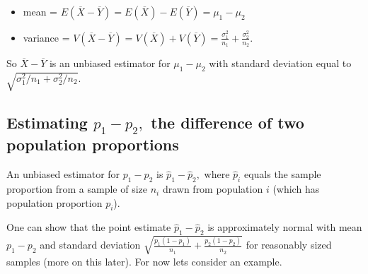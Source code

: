 \documentclass[
]{book}
\providecommand{\tightlist}{%
  \setlength{\itemsep}{0pt}\setlength{\parskip}{0pt}}
\theoremstyle{definition}
\theoremstyle{definition}
\theoremstyle{definition}
\theoremstyle{definition}
\theoremstyle{remark}
\begin{document}
\begin{itemize}
\tightlist
\item
  mean = \(E(\overline{X}-\overline{Y}) = E(\overline{X})-E(\overline{Y}) = \mu_1 - \mu_2\)
\item
  variance = \(V(\overline{X}-\overline{Y}) = V(\overline{X})+V(\overline{Y}) = \frac{\sigma_1^2}{n_1} + \frac{\sigma_2^2}{n_2}\).
\end{itemize}

So \(\overline{X}-\overline{Y}\) is an unbiased estimator for \(\mu_1 - \mu_2\) with standard deviation equal to \(\displaystyle\sqrt{\sigma_1^2/n_1 + \sigma_2^2/n_2}.\)

\subsection{\texorpdfstring{Estimating \(p_1 - p_2,\) the difference of two population proportions}{Estimating p\_1 - p\_2, the difference of two population proportions}}\label{estimating-p_1---p_2-the-difference-of-two-population-proportions}

An unbiased estimator for \(p_1-p_2\) is \(\hat{p}_1-\hat{p}_2,\) where \(\hat{p}_i\) equals the sample proportion from a sample of size \(n_i\) drawn from population \(i\) (which has population proportion \(p_i\)).

One can show that the point estimate \(\hat{p}_1 - \hat{p}_2\) is approximately normal with mean \(p_1-p_2\) and standard deviation \(\displaystyle \sqrt{\frac{p_1(1-p_1)}{n_1}+\frac{p_2(1-p_2)}{n_2}}\) for reasonably sized samples (more on this later). For now lets consider an example.
\end{document}
